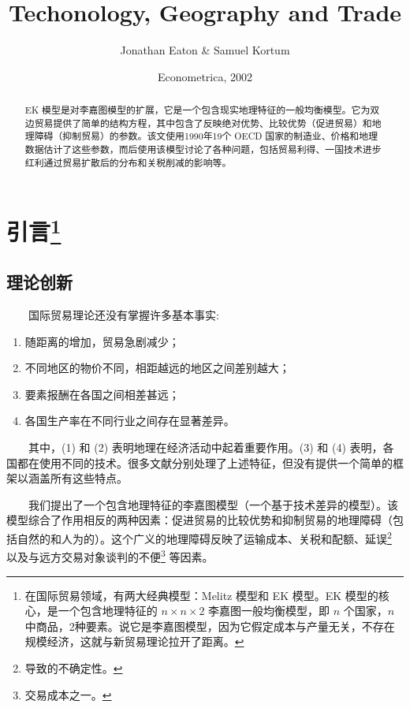 \documentclass[
]{article}
\title{Techonology, Geography and Trade}
\author{Jonathan Eaton \& Samuel Kortum}
\date{Econometrica, 2002}
\providecommand{\tightlist}{%
  \setlength{\itemsep}{0pt}\setlength{\parskip}{0pt}}
\begin{document}
\maketitle
\begin{abstract}
EK 模型是对李嘉图模型的扩展，它是一个包含现实地理特征的一般均衡模型。它为双边贸易提供了简单的结构方程，其中包含了反映绝对优势、比较优势（促进贸易）和地理障碍（抑制贸易）的参数。该文使用1990年19个 OECD 国家的制造业、价格和地理数据估计了这些参数，而后使用该模型讨论了各种问题，包括贸易利得、一国技术进步红利通过贸易扩散后的分布和关税削减的影响等。
\end{abstract}

{
\setcounter{tocdepth}{3}
\tableofcontents
}
\hypertarget{ux5f15ux8a00}{%
\section[引言]{\texorpdfstring{引言\footnote{在国际贸易领域，有两大经典模型：Melitz 模型和 EK 模型。EK 模型的核心，是一个包含地理特征的 \(n \times n \times 2\) 李嘉图一般均衡模型，即 \(n\) 个国家，\(n\) 中商品，2种要素。说它是李嘉图模型，因为它假定成本与产量无关，不存在规模经济，这就与新贸易理论拉开了距离。}}{引言}}\label{ux5f15ux8a00}}

\hypertarget{ux7406ux8bbaux521bux65b0}{%
\subsection{理论创新}\label{ux7406ux8bbaux521bux65b0}}

　　国际贸易理论还没有掌握许多基本事实:

\begin{enumerate}
\def\labelenumi{(\arabic{enumi})}
\tightlist
\item
  随距离的增加，贸易急剧减少；\\
\item
  不同地区的物价不同，相距越远的地区之间差别越大；\\
\item
  要素报酬在各国之间相差甚远；\\
\item
  各国生产率在不同行业之间存在显著差异。
\end{enumerate}

　　其中，(1) 和 (2) 表明地理在经济活动中起着重要作用。(3) 和 (4) 表明，各国都在使用不同的技术。很多文献分别处理了上述特征，但没有提供一个简单的框架以涵盖所有这些特点。

　　我们提出了一个包含地理特征的李嘉图模型（一个基于技术差异的模型）。该模型综合了作用相反的两种因素：促进贸易的比较优势和抑制贸易的地理障碍（包括自然的和人为的）。这个广义的地理障碍反映了运输成本、关税和配额、延误\footnote{导致的不确定性。} 以及与远方交易对象谈判的不便\footnote{交易成本之一。} 等因素。
\end{document}
